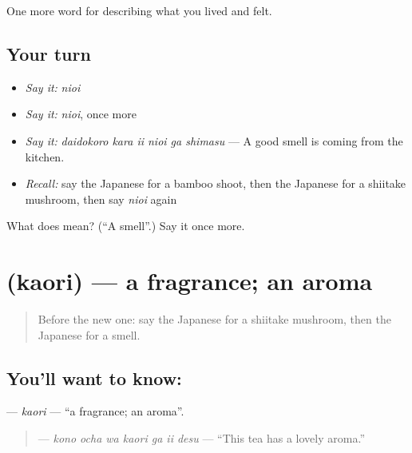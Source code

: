 \begin{grammarlens}[title={What you've built}]
One more word for describing what you lived and felt.
\end{grammarlens}

\subsection*{Your turn}
\begin{itemize}
\raggedright
  \item \emph{Say it:} \emph{nioi}
  \item \emph{Say it:} \emph{nioi}, once more
  \item \emph{Say it:} \emph{daidokoro kara ii nioi ga shimasu} — A good smell is coming from the kitchen.
  \item \emph{Recall:} say the Japanese for a bamboo shoot, then the Japanese for a shiitake mushroom, then say \emph{nioi} again
\end{itemize}

\begin{tcolorbox}[breakable,colback=teal!4,colframe=teal!35!black,title={Before you move on}]
What does  mean? (\textquotedblleft{}A smell\textquotedblright{}.) Say it once more.
\end{tcolorbox}
\section[\texorpdfstring{\ja{かおり} (kaori)}{かおり (kaori)}]{ (kaori) — a fragrance; an aroma}

\label{lesson:JA-C495-kaori}



\begin{quote}
Before the new one: say the Japanese for a shiitake mushroom, then the Japanese for a smell.
\end{quote}

\subsection*{You'll want to know: }
\textbf{} — \emph{kaori} — \textquotedblleft{}a fragrance; an aroma\textquotedblright{}.

\begin{quote}
\textbf{   } — \emph{kono ocha wa kaori ga ii desu} — \textquotedblleft{}This tea has a lovely aroma.\textquotedblright{}
\end{quote}

